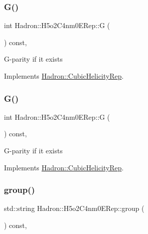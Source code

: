 \subsubsection{\texorpdfstring{G()}{G()}\hspace{0.1cm}{\footnotesize\ttfamily [2/3]}}
{\footnotesize\ttfamily int Hadron\+::\+H5o2\+C4nm0\+E\+Rep\+::G (\begin{DoxyParamCaption}{ }\end{DoxyParamCaption}) const\hspace{0.3cm}{\ttfamily [inline]}, {\ttfamily [virtual]}}

G-\/parity if it exists 

Implements \mbox{\hyperlink{structHadron_1_1CubicHelicityRep_a50689f42be1e6170aa8cf6ad0597018b}{Hadron\+::\+Cubic\+Helicity\+Rep}}.

\mbox{\label{structHadron_1_1H5o2C4nm0ERep_a9dfac60bb29f12f13f0672f303630db6}} 
\subsubsection{\texorpdfstring{G()}{G()}\hspace{0.1cm}{\footnotesize\ttfamily [3/3]}}
{\footnotesize\ttfamily int Hadron\+::\+H5o2\+C4nm0\+E\+Rep\+::G (\begin{DoxyParamCaption}{ }\end{DoxyParamCaption}) const\hspace{0.3cm}{\ttfamily [inline]}, {\ttfamily [virtual]}}

G-\/parity if it exists 

Implements \mbox{\hyperlink{structHadron_1_1CubicHelicityRep_a50689f42be1e6170aa8cf6ad0597018b}{Hadron\+::\+Cubic\+Helicity\+Rep}}.

\mbox{\label{structHadron_1_1H5o2C4nm0ERep_ab94ac981b014d47f96785b1985df343c}} 
\subsubsection{\texorpdfstring{group()}{group()}\hspace{0.1cm}{\footnotesize\ttfamily [1/3]}}
{\footnotesize\ttfamily std\+::string Hadron\+::\+H5o2\+C4nm0\+E\+Rep\+::group (\begin{DoxyParamCaption}{ }\end{DoxyParamCaption}) const\hspace{0.3cm}{\ttfamily [inline]}, {\ttfamily [virtual]}}

